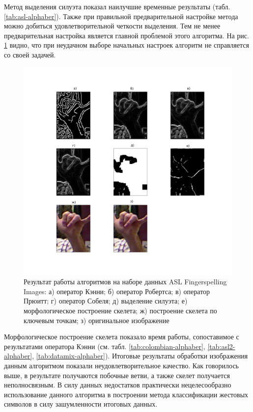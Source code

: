 Метод выделения силуэта показал наилучшие временные результаты (табл. \ref{tab:asl-alphaber}). Также при правильной предварительной настройке метода можно добиться удовлетворительной четкости выделения. Тем не менее предварительная настройка является главной проблемой этого алгоритма. На рис. \ref{an:compare} видно, что при неудачном выборе начальных настроек алгоритм не справляется со своей задачей.

\begin{figure}[!h]
	\centering
	\includegraphics[width=\textwidth]{inc/img/compare1}
	\caption{Результат работы алгоритмов на наборе данных ASL Fingerspelling Images: а) оператор Кэнни; б) оператор Робертса; в) оператор Прюитт; г) оператор Собеля; д) выделение силуэта; е) морфологическое построение скелета; ж) построение скелета по ключевым точкам; з) оригинальное изображение}
	\label{an:compare}
\end{figure}

Морфологическое построение скелета показало время работы, сопоставимое с результатами оператора Кэнни (см. табл. \ref{tab:colombian-alphaber}, \ref{tab:asl2-alphaber}, \ref{tab:datamix-alphaber}). Итоговые результаты обработки изображения данным алгоритмом показали неудовлетворительное качество. Как говорилось выше, в результате получаются побочные ветви, а также скелет получается неполносвязным. В силу данных недостатков практически нецелесообразно использование данного алгоритма в построении метода классификации жестовых символов в силу зашумленности итоговых данных.

